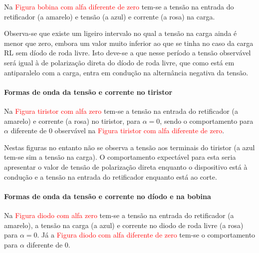 \documentclass[a4paper,11pt]{article}
\numberwithin{equation}{section}
\begin{document}

Na \textcolor{red}{Figura bobina com alfa diferente de zero} tem-se a tensão na entrada do retificador (a amarelo) e tensão (a azul) e corrente (a rosa) na carga.

Observa-se que existe um ligeiro intervalo no qual a tensão na carga ainda é menor que zero, embora um valor muito inferior ao que se tinha no caso da carga RL sem díodo de roda livre. Isto deve-se a que nesse período a tensão observável será igual à de polarização direta do díodo de roda livre, que como está em antiparalelo com a carga, entra em condução na alternância negativa da tensão. 

\paragraph{Formas de onda da tensão e corrente no tiristor}



Na \textcolor{red}{Figura tiristor com alfa zero} tem-se a tensão na entrada do retificador (a amarelo) e corrente (a rosa) no tiristor, para $\alpha = 0$, sendo o comportamento para $\alpha$ diferente de $0$ observável na \textcolor{red}{Figura tiristor com alfa diferente de zero}.

Nestas figuras no entanto não se observa a tensão aos terminais do tiristor (a azul tem-se sim a tensão na carga). O comportamento expectável para esta seria apresentar o valor de tensão de polarização direta enquanto o dispositivo está à condução e a tensão na entrada do retificador enquanto está ao corte.

\paragraph{Formas de onda da tensão e corrente no díodo e na bobina}



Na \textcolor{red}{Figura diodo com alfa zero} tem-se a tensão na entrada do retificador (a amarelo), a tensão na carga (a azul) e corrente no diodo de roda livre (a rosa) para $\alpha = 0$. Já a \textcolor{red}{Figura diodo com alfa diferente de zero} tem-se o comportamento para $\alpha$ diferente de $0$.
\end{document}
